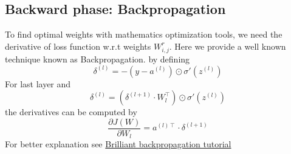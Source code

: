 \documentclass[10pt]{SelfArx} %
\begin{document}
\subsection{Backward phase: Backpropagation}
To find optimal weights with mathematics optimization tools, we need the derivative of loss function w.r.t weights $W_{i,j}^r$. Here we provide a well known technique known as Backpropagation.
by defining
\begin{equation}
\delta^{(l)} = -(y - a^{(l)})\odot\sigma'(z^{(l)})
\end{equation}
For last layer and 
\begin{equation}
\delta^{(l)} = (\delta^{(l + 1)} \cdot W_{l}^{\intercal})\odot\sigma'(z^{(l)})
\end{equation}
the derivatives can be computed by
\begin{equation}
\displaystyle\frac{\partial J(W)}{\partial W_{l}} = a^{(l)\intercal} \cdot \delta^{(l + 1)}
\end{equation}
For better explanation see \href{https://brilliant.org/wiki/backpropagation/}{Brilliant backpropagation tutorial}
\end{document}
